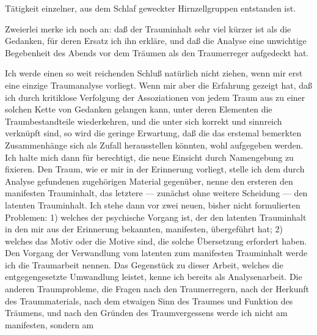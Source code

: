 \documentclass{article}
\begin{document}
         
            
            
            
        \pstart
        Tätigkeit einzelner, aus dem Schlaf geweckter Hirnzellgruppen
               entstanden ist.
        \pend
    
            
        \pstart
        Zweierlei merke ich noch an: daß der Trauminhalt sehr viel kürzer ist als die
               Gedanken, für deren Ersatz ich ihn erkläre, und daß die Analyse eine unwichtige
               Begebenheit des Abends vor dem Träumen als den Traumerreger aufgedeckt hat.
        \pend
    
            
        \pstart
        Ich werde einen so weit reichenden Schluß natürlich nicht ziehen, wenn mir erst
               eine einzige Traumanalyse vorliegt. Wenn mir aber die Erfahrung gezeigt hat, daß
               ich durch kritiklose Verfolgung der Assoziationen von jedem Traum aus zu einer solchen Kette von
               Gedanken gelangen kann, unter deren Elementen die Traumbestandteile
               wiederkehren, und die unter sich korrekt und sinnreich verknüpft sind, so wird
               die geringe Erwartung, daß die das erstemal bemerkten Zusammenhänge sich als
               Zufall herausstellen könnten, wohl aufgegeben werden. Ich halte mich
               dann für berechtigt, die neue Einsicht durch Namengebung zu fixieren. Den
               Traum, wie er mir in der Erinnerung vorliegt, stelle ich dem durch Analyse
               gefundenen zugehörigen Material gegenüber, nenne den ersteren den manifesten Trauminhalt, das letztere — zunächst
               ohne weitere Scheidung — den latenten Trauminhalt.
               Ich stehe dann vor zwei neuen, bisher nicht formulierten Problemen: 1) welches der psychische Vorgang ist, der den latenten
               Trauminhalt in den mir aus der Erinnerung bekannten, manifesten, übergeführt
               hat; 2) welches das Motiv oder die Motive sind, die
               solche Übersetzung erfordert haben. Den Vorgang der Verwandlung vom latenten zum
               manifesten Trauminhalt werde ich die Traumarbeit
               nennen. Das Gegenstück zu dieser Arbeit, welches die entgegengesetzte
               Umwandlung leistet, kenne ich bereits als Analysenarbeit. Die anderen Traumprobleme, die Fragen nach den
               Traumerregern, nach der Herkunft des Traummaterials, nach dem etwaigen Sinn
               des Traumes und Funktion des Träumens, und nach den Gründen des
               Traumvergessens werde ich nicht am manifesten, sondern am
        \pend
    
\end{document}
